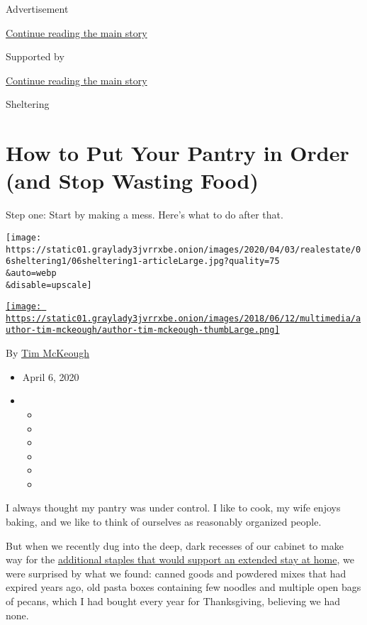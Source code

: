 Advertisement

\protect\hyperlink{after-top}{Continue reading the main story}

Supported by

\protect\hyperlink{after-sponsor}{Continue reading the main story}

Sheltering

\hypertarget{how-to-put-your-pantry-in-order-and-stop-wasting-food}{%
\section{How to Put Your Pantry in Order (and Stop Wasting
Food)}\label{how-to-put-your-pantry-in-order-and-stop-wasting-food}}

Step one: Start by making a mess. Here's what to do after that.

\texttt{[image: https://static01.graylady3jvrrxbe.onion/images/2020/04/03/realestate/06sheltering1/06sheltering1-articleLarge.jpg?quality=75\\\&auto=webp\\\&disable=upscale]}

\href{https://www.nytimes3xbfgragh.onion/by/tim-mckeough}{\texttt{[image: https://static01.graylady3jvrrxbe.onion/images/2018/06/12/multimedia/author-tim-mckeough/author-tim-mckeough-thumbLarge.png]}}

By \href{https://www.nytimes3xbfgragh.onion/by/tim-mckeough}{Tim
McKeough}

\begin{itemize}
\item
  April 6, 2020
\item
  \begin{itemize}
  \item
  \item
  \item
  \item
  \item
  \item
  \end{itemize}
\end{itemize}

I always thought my pantry was under control. I like to cook, my wife
enjoys baking, and we like to think of ourselves as reasonably organized
people.

But when we recently dug into the deep, dark recesses of our cabinet to
make way for the
\href{https://www.nytimes3xbfgragh.onion/2020/03/06/dining/how-to-stock-a-pantry.html}{additional
staples that would support an extended stay at home}, we were surprised
by what we found: canned goods and powdered mixes that had expired years
ago, old pasta boxes containing few noodles and multiple open bags of
pecans, which I had bought every year for Thanksgiving, believing we had
none.

